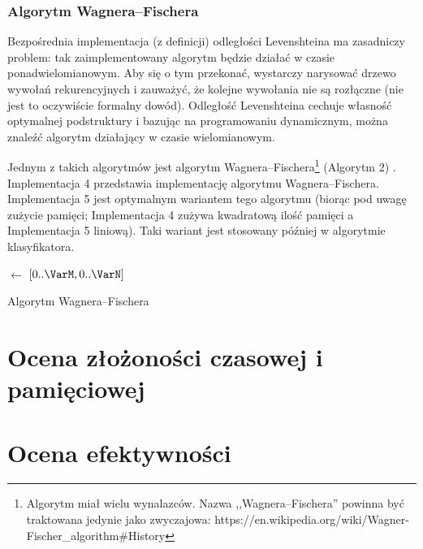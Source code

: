 \subsubsection{Algorytm Wagnera--Fischera}
Bezpośrednia implementacja (z definicji) odległości Levenshteina ma zasadniczy
problem: tak zaimplementowany algorytm będzie działać w czasie
ponadwielomianowym. Aby się o tym przekonać, wystarczy narysować drzewo wywołań
rekurencyjnych i zauważyć, że kolejne wywołania nie są rozłączne (nie jest to
oczywiście formalny dowód). Odległość Levenshteina cechuje własność optymalnej
podstruktury i bazując na programowaniu dynamicznym, można znaleźć algorytm
działający w czasie wielomianowym.

Jednym z takich algorytmów jest algorytm Wagnera--Fischera\footnote{Algorytm
	miał wielu wynalazców. Nazwa ,,Wagnera--Fischera'' powinna być traktowana
	jedynie jako zwyczajowa:
	https://en.wikipedia.org/wiki/Wagner-Fischer\_algorithm\#History} (Algorytm 2)
\cite{wagner1974string}. Implementacja 4 przedstawia implementację algorytmu
Wagnera--Fischera. Implementacja 5 jest optymalnym wariantem tego algorytmu
(biorąc pod uwagę zużycie pamięci; Implementacja 4 zużywa kwadratową ilość
pamięci a Implementacja 5 liniową). Taki wariant jest stosowany później w
algorytmie klasyfikatora.

\begin{algorithm}
	\SetAlgoVlined
	\BlankLine
	\BlankLine
	\VarD $\leftarrow$ $[0..\VarM, 0..\VarN]$
	\BlankLine
	\Return{$\VarD[\VarM, \VarN]$}
	\caption{Algorytm Wagnera--Fischera}
\end{algorithm}





\section{Ocena złożoności czasowej i pamięciowej}

\section{Ocena efektywności}

